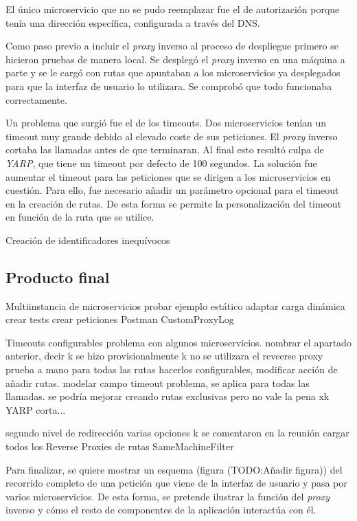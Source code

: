 \documentclass[11pt,spanish,listoffigures]{tfgetsinf}
\begin{document}
El único microservicio que no se pudo reemplazar fue el de autorización porque tenía una dirección específica, configurada a través del DNS.

Como paso previo a incluir el \emph{proxy} inverso al proceso de despliegue primero se hicieron pruebas de manera local. Se desplegó el \emph{proxy} inverso en una máquina a parte y se le cargó con rutas que apuntaban a los microservicios ya desplegados para que la interfaz de usuario lo utilizara. Se comprobó que todo funcionaba correctamente.

Un problema que surgió fue el de los timeouts. Dos microservicios tenían un timeout muy grande debido al elevado coste de sus peticiones. El \emph{proxy} inverso cortaba las llamadas antes de que terminaran. Al final esto resultó culpa de \emph{YARP}, que tiene un timeout por defecto de 100 segundos. La solución fue aumentar el timeout para las peticiones que se dirigen a los microservicios en cuestión. Para ello, fue necesario añadir un parámetro opcional para el timeout en la creación de rutas. De esta forma se permite la personalización del timeout en función de la ruta que se utilice.

Creación de identificadores inequívocos


		\subsection{Producto final}

Multiinstancia de microservicios
probar ejemplo estático
adaptar carga dinámica
crear tests
crear peticiones Postman
CustomProxyLog

Timeouts configurables
problema con algunos microservicios. nombrar el apartado anterior, decir k se hizo provisionalmente k no se utilizara el reveerse proxy
prueba a mano para todas las rutas
hacerlos configurables, modificar acción de añadir rutas. modelar campo timeout
problema, se aplica para todas las llamadas. se podría mejorar creando rutas exclusivas pero no vale la pena xk YARP corta...

segundo nivel de redirección
varias opciones k se comentaron en la reunión
cargar todos los Reverse Proxies de rutas
SameMachineFilter

Para finalizar, se quiere mostrar un esquema (figura (TODO:Añadir figura)) del recorrido completo de una petición que viene de la interfaz de usuario y pasa por varios microservicios. De esta forma, se pretende ilustrar la función del \emph{proxy} inverso y cómo el resto de componentes de la aplicación interactúa con él.
\end{document}
